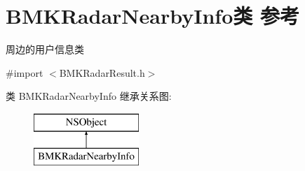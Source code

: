 \hypertarget{interface_b_m_k_radar_nearby_info}{}\section{B\+M\+K\+Radar\+Nearby\+Info类 参考}
\label{interface_b_m_k_radar_nearby_info}


周边的用户信息类  




{\ttfamily \#import $<$B\+M\+K\+Radar\+Result.\+h$>$}

类 B\+M\+K\+Radar\+Nearby\+Info 继承关系图\+:\begin{figure}[H]
\begin{center}
\leavevmode
\includegraphics[height=2.000000cm]{interface_b_m_k_radar_nearby_info}
\end{center}
\end{figure}
